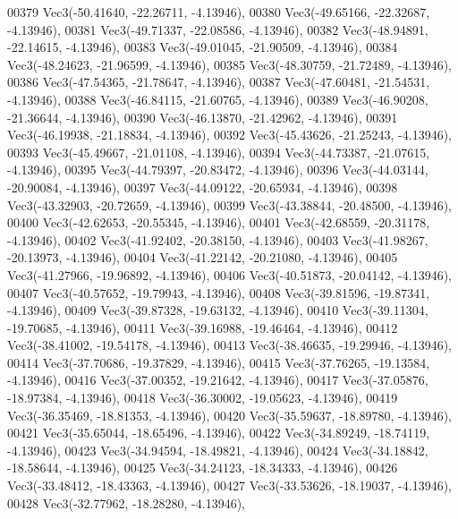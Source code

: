 \begin{DoxyCode}
00379         Vec3(-50.41640, -22.26711, -4.13946),
00380         Vec3(-49.65166, -22.32687, -4.13946),
00381         Vec3(-49.71337, -22.08586, -4.13946),
00382         Vec3(-48.94891, -22.14615, -4.13946),
00383         Vec3(-49.01045, -21.90509, -4.13946),
00384         Vec3(-48.24623, -21.96599, -4.13946),
00385         Vec3(-48.30759, -21.72489, -4.13946),
00386         Vec3(-47.54365, -21.78647, -4.13946),
00387         Vec3(-47.60481, -21.54531, -4.13946),
00388         Vec3(-46.84115, -21.60765, -4.13946),
00389         Vec3(-46.90208, -21.36644, -4.13946),
00390         Vec3(-46.13870, -21.42962, -4.13946),
00391         Vec3(-46.19938, -21.18834, -4.13946),
00392         Vec3(-45.43626, -21.25243, -4.13946),
00393         Vec3(-45.49667, -21.01108, -4.13946),
00394         Vec3(-44.73387, -21.07615, -4.13946),
00395         Vec3(-44.79397, -20.83472, -4.13946),
00396         Vec3(-44.03144, -20.90084, -4.13946),
00397         Vec3(-44.09122, -20.65934, -4.13946),
00398         Vec3(-43.32903, -20.72659, -4.13946),
00399         Vec3(-43.38844, -20.48500, -4.13946),
00400         Vec3(-42.62653, -20.55345, -4.13946),
00401         Vec3(-42.68559, -20.31178, -4.13946),
00402         Vec3(-41.92402, -20.38150, -4.13946),
00403         Vec3(-41.98267, -20.13973, -4.13946),
00404         Vec3(-41.22142, -20.21080, -4.13946),
00405         Vec3(-41.27966, -19.96892, -4.13946),
00406         Vec3(-40.51873, -20.04142, -4.13946),
00407         Vec3(-40.57652, -19.79943, -4.13946),
00408         Vec3(-39.81596, -19.87341, -4.13946),
00409         Vec3(-39.87328, -19.63132, -4.13946),
00410         Vec3(-39.11304, -19.70685, -4.13946),
00411         Vec3(-39.16988, -19.46464, -4.13946),
00412         Vec3(-38.41002, -19.54178, -4.13946),
00413         Vec3(-38.46635, -19.29946, -4.13946),
00414         Vec3(-37.70686, -19.37829, -4.13946),
00415         Vec3(-37.76265, -19.13584, -4.13946),
00416         Vec3(-37.00352, -19.21642, -4.13946),
00417         Vec3(-37.05876, -18.97384, -4.13946),
00418         Vec3(-36.30002, -19.05623, -4.13946),
00419         Vec3(-36.35469, -18.81353, -4.13946),
00420         Vec3(-35.59637, -18.89780, -4.13946),
00421         Vec3(-35.65044, -18.65496, -4.13946),
00422         Vec3(-34.89249, -18.74119, -4.13946),
00423         Vec3(-34.94594, -18.49821, -4.13946),
00424         Vec3(-34.18842, -18.58644, -4.13946),
00425         Vec3(-34.24123, -18.34333, -4.13946),
00426         Vec3(-33.48412, -18.43363, -4.13946),
00427         Vec3(-33.53626, -18.19037, -4.13946),
00428         Vec3(-32.77962, -18.28280, -4.13946),

\end{DoxyCode}
